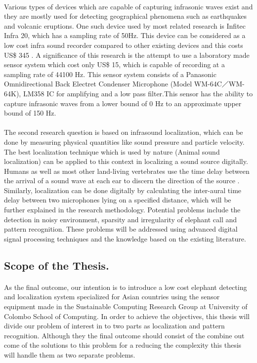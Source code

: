 \documentclass[12pt]{article}
\numberwithin{figure}{section}
\numberwithin{table}{section}
\begin{document}
\paragraph{}
Various types of devices which are capable of capturing infrasonic waves exist and they are mostly used for detecting geographical phenomena such as earthquakes and volcanic eruptions. One such device used by most related research is Infitec Infra 20, which has a sampling rate of 50Hz. This device can be considered as a low cost infra sound recorder compared to other existing devices and this costs US\$ 345 \cite {7}. A significance of this research is the attempt to use a laboratory made sensor system which cost only US\$ 15, which is capable of recording at a sampling rate of 44100 Hz. This sensor system consists of a Panasonic Omnidirectional Back Electret Condenser Microphone \cite{15} (Model WM-64C／WM-64K), LM358 IC for amplifying and a low pass filter\cite{16}.This sensor has the ability to capture infrasonic waves from a lower bound of 0 Hz to an approximate upper bound of 150 Hz.


\paragraph{}
The second research question is based on infrasound localization, which can be done by measuring physical quantities like sound pressure and particle velocity. The best localization technique which is used by nature (Animal sound localization) can be applied to this context in localizing a sound source digitally. Humans as well as most other land-living vertebrates use the time delay between the arrival of a sound wave at each ear to discern the direction of the source \cite {8}. Similarly, localization can be done digitally by calculating the inter-aural time delay  between two microphones lying on a specified distance, which will be further explained in the research methodology. Potential problems include the detection in noisy environment, sparsity and irregularity of elephant call and pattern recognition. These problems will be addressed using advanced digital signal processing techniques and the knowledge based on the existing literature.

\subsection{Scope of the Thesis.}
\paragraph{}
As the final outcome, our intention is to introduce a low cost elephant detecting and localization system specialized for Asian countries using the sensor equipment made in the Sustainable Computing Research Group at University of Colombo School of Computing. In order to achieve the objectives, this thesis will divide our problem of interest in to two parts as localization and pattern recognition. Although they the final outcome should consist of the combine out come of the solutions to this problem for a reducing the complexity this thesis will handle them as two separate problems. 
\end{document}
